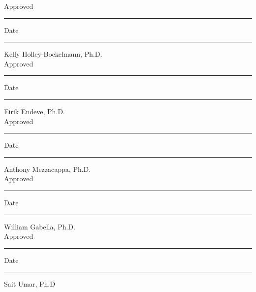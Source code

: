 \documentclass[10pt]{article}
\begin{document}
\noindent Approved \rule[-3pt]{3.5in}{.5pt} \hskip 0.1in %
          Date     \rule[-3pt]{1.5in}{.5pt}
\hspace*{1.3in} Kelly Holley-Bockelmann, Ph.D. \\[0.15in]
\noindent Approved \rule[-3pt]{3.5in}{.5pt} \hskip 0.1in %
          Date     \rule[-3pt]{1.5in}{.5pt}
\hspace*{1.3in} Eirik Endeve, Ph.D. \\[0.15in]
\noindent Approved \rule[-3pt]{3.5in}{.5pt} \hskip 0.1in %
          Date     \rule[-3pt]{1.5in}{.5pt}
\hspace*{1.3in} Anthony Mezzacappa, Ph.D. \\[0.15in]
\noindent Approved \rule[-3pt]{3.5in}{.5pt} \hskip 0.1in %
          Date     \rule[-3pt]{1.5in}{.5pt}
\hspace*{1.3in} William Gabella, Ph.D. \\[0.15in]
\noindent Approved \rule[-3pt]{3.5in}{.5pt} \hskip 0.1in %
          Date     \rule[-3pt]{1.5in}{.5pt}
\hspace*{1.3in} Sait Umar, Ph.D
\end{document}
